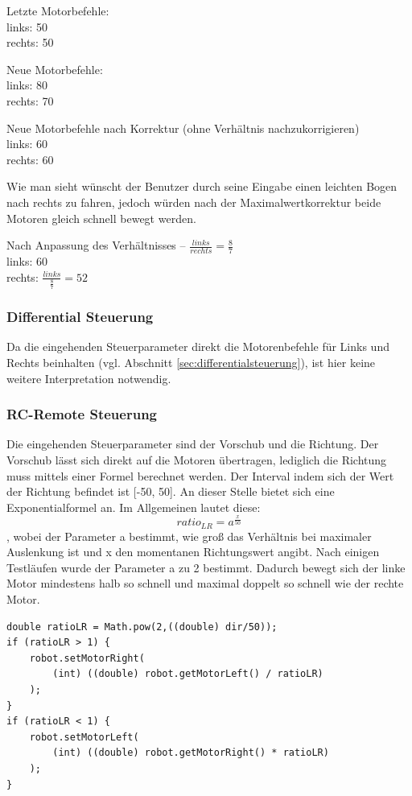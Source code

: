 Letzte Motorbefehle: \\
	links: 50 \\
	rechts: 50 
	
Neue Motorbefehle: \\
	links: 80 \\
	rechts: 70 
	
Neue Motorbefehle nach Korrektur (ohne Verhältnis nachzukorrigieren) \\
	links: 60 \\
	rechts: 60 
	
Wie man sieht wünscht der Benutzer durch seine Eingabe einen leichten Bogen nach rechts zu fahren, jedoch würden nach der Maximalwertkorrektur beide Motoren gleich schnell bewegt werden.

Nach Anpassung des Verhältnisses -- $\frac{links}{rechts} = \frac{8}{7}$ \\
	links: 60 \\
	rechts: $\frac{links}{\frac{8}{7}} = 52$


\subsubsection{Differential Steuerung}
Da die eingehenden Steuerparameter direkt die Motorenbefehle für Links und Rechts beinhalten (vgl. Abschnitt \ref{sec:differentialsteuerung}), ist hier keine weitere Interpretation notwendig. 

\subsubsection{RC-Remote Steuerung}
\label{sec:rcremote_server}
Die eingehenden Steuerparameter sind der Vorschub und die Richtung. Der Vorschub lässt sich direkt auf die Motoren übertragen, lediglich die Richtung muss mittels einer Formel berechnet werden. Der Interval indem sich der Wert der Richtung befindet ist [-50, 50]. An dieser Stelle bietet sich eine Exponentialformel an. 
Im Allgemeinen lautet diese: 
{\Large \[ratio_{LR} = a^{\frac{x}{50}}\]},
wobei der Parameter a bestimmt, wie groß das Verhältnis bei maximaler Auslenkung ist und x den momentanen Richtungswert angibt.
Nach einigen Testläufen wurde der Parameter a zu 2 bestimmt. Dadurch bewegt sich der linke Motor mindestens halb so schnell und maximal doppelt so schnell wie der rechte Motor.

\begin{lstlisting}
double ratioLR = Math.pow(2,((double) dir/50));
if (ratioLR > 1) {
	robot.setMotorRight(
		(int) ((double) robot.getMotorLeft() / ratioLR)
	); 
}
if (ratioLR < 1) {
	robot.setMotorLeft(
		(int) ((double) robot.getMotorRight() * ratioLR)
	);
}
\end{lstlisting}


